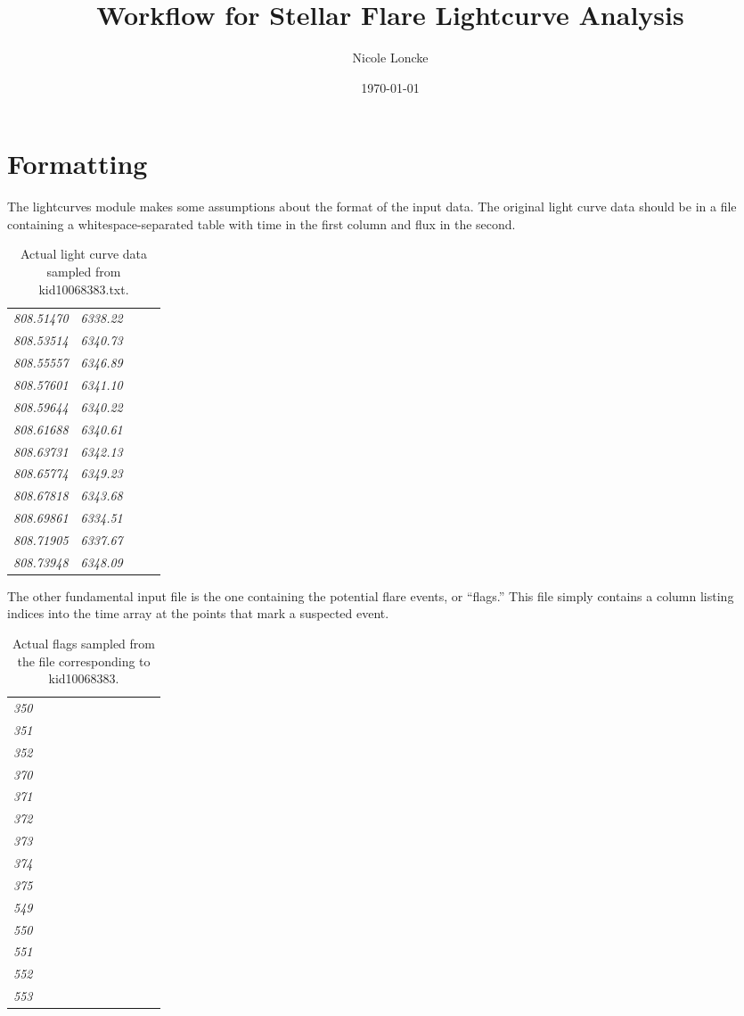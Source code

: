 \documentclass{article}
\author{Nicole Loncke}
\date{\today}
\title{Workflow for Stellar Flare Lightcurve Analysis}
\begin{document}
\maketitle{}

\section{Formatting}
\label{sec:format}

The lightcurves module makes some assumptions about the format of the
input data.  The original light curve data should be in a file
containing a whitespace-separated table with time in the first column
and flux in the second.
\begin{table}[h]
  \centering
  \begin{tabular}{>{\itshape}p{0.2\linewidth} >{\itshape}l}
       808.51470   &   6338.22 \\
       808.53514   &   6340.73 \\
       808.55557   &   6346.89 \\
       808.57601   &   6341.10 \\
       808.59644   &   6340.22 \\
       808.61688   &   6340.61 \\
       808.63731   &   6342.13 \\
       808.65774   &   6349.23 \\
       808.67818   &   6343.68 \\
       808.69861   &   6334.51 \\
       808.71905   &   6337.67 \\
       808.73948   &   6348.09 \\
\end{tabular}
\caption{Actual light curve data sampled from kid10068383.txt.}
\end{table}

The other fundamental input file is the one containing the potential
flare events, or ``flags.''  This file simply contains a column
listing indices into the time array at the points that mark a
suspected event.

\begin{table}[h]
  \centering
  \begin{tabular}{>{\itshape}p{0.2\linewidth}l}
         350 \\
         351 \\
         352 \\
         370 \\
         371 \\
         372 \\
         373 \\
         374 \\
         375 \\
         549 \\ 
         550 \\ 
         551 \\
         552 \\
         553 \\
\end{tabular}
\caption{Actual flags sampled from the file corresponding to
  kid10068383.}
\end{table}
\end{document}

